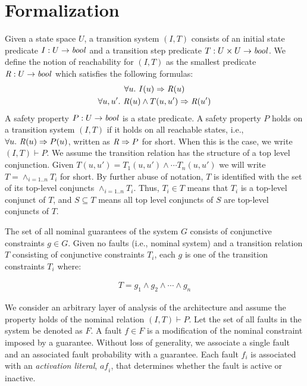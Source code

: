 \section{Formalization}
\label{sec:formalization}
Given a state space $U$, a transition system $(I,T)$ consists of an
initial state predicate $I : U \to \mathit{bool}$ and a transition step
predicate $T : U \times U \to \mathit{bool}$.
We define the notion of
reachability for $(I, T)$ as the smallest predicate $\mathit{R} : U \to
\mathit{bool}$ which satisfies the following formulas:
\begin{gather*}
  \forall u.~ I(u) \Rightarrow \mathit{R}(u) \\
  \forall u, u'.~ \mathit{R}(u) \land T(u, u') \Rightarrow \mathit{R}(u')
\end{gather*}
A safety property $P : U \to \mathit{bool}$ is a state predicate. A safety
property $P$ holds on a transition system $(I, T)$ if it holds on all
reachable states, i.e., $\forall u.~ \mathit{R}(u) \Rightarrow P(u)$,
written as $\mathit{R} \Rightarrow P$ for short. When this is the case, we
write $(I, T)\vdash P$. We assume the transition relation has the structure of a top level conjunction. Given $T(u, u') = T_1(u,u') \land \cdots T_n(u,u')$ we will write $T = \land_{i=1..n}T_i$ for short. By further abuse of notation, $T$ is identified with the set of its top-level conjuncts $\land_{i=1..n}T_i$.%
Thus, $T_i \in T$ means that $T_i$ is a top-level conjunct of $T$, and $S\subseteq T$ means all top level conjuncts of $S$ are top-level conjuncts of $T$. %

The set of all nominal guarantees of the system $G$ consists of conjunctive constraints $g \in G$. Given no faults (i.e., nominal system) and a transition relation $T$ consisting of conjunctive constraints $T_i$, each $g$ is one of the transition constraints $T_i$ where:

\begin{gather}
T = g_1 \land  g_2 \land \cdots \land g_n
\label{eq:Tn}
\end{gather}

We consider an arbitrary layer of analysis of the architecture and assume the property holds of the nominal relation $(I,T) \vdash P$. Let the set of all faults in the system be  denoted as $F$. A fault $f \in F$ is a modification of the nominal constraint imposed by a guarantee. Without loss of generality, we associate a single fault and an associated fault probability with a guarantee. Each fault $f_i$ is associated with an \emph{activation literal}, $\mathit{af_i}$, that determines whether the fault is active or inactive. %

